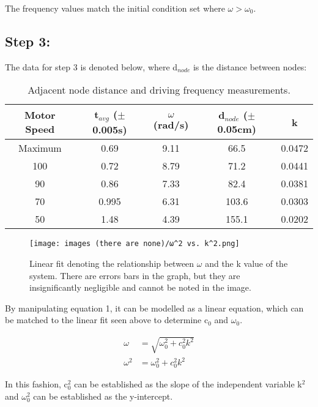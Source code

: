 \documentclass[12pt, letterpaper, twoside]{article}
\begin{document}
The frequency values match the initial condition set where $\omega > \omega_0$.

\subsection{Step 3:}

The data for step 3 is denoted below, where d$_{node}$ is the distance between nodes:

\begin{table}[!ht]
    \centering
        \begin{tabular}{|c|c|c|c|c|}
            \hline
            Motor Speed & t$_{avg}$ ($\pm$0.005s) & $\omega$ (rad/s) & d$_{node}$  ($\pm$0.05cm) & k \\
            \hline
            Maximum & 0.69 & 9.11 & 66.5 & 0.0472 \\
            \hline
            100 & 0.72 & 8.79 & 71.2 & 0.0441 \\
            \hline
            90 & 0.86 & 7.33 & 82.4 & 0.0381 \\
            \hline
            70 & 0.995 & 6.31 & 103.6 & 0.0303 \\
            \hline
            50 & 1.48 & 4.39 & 155.1 & 0.0202 \\
            \hline
        \end{tabular}
    \caption{Adjacent node distance and driving frequency measurements.}
    \label{tab:my_label}
\end{table}


\begin{figure}[!ht]
    \centering
    \texttt{[image: images (there are none)/ω^2 vs. k^2.png]}
    \caption{Linear fit denoting the relationship between $\omega$ and the k value of the system. There are errors bars in the graph, but they are insignificantly negligible and cannot be noted in the image.}
    \label{fig:my_label}
\end{figure}

By manipulating equation 1, it can be modelled as a linear equation, which can be matched to the linear fit seen above to determine c$_0$ and $\omega_0$.

\begin{align*}
    \omega &= \sqrt{\omega_0^2 + c_0^2k^2} \\
    \omega^2 &= \omega_0^2 + c_0^2k^2
\end{align*}

In this fashion, c$_0^2$ can be established as the slope of the independent variable k$^2$ and $\omega_0^2$ can be established as the y-intercept. 
\end{document}
